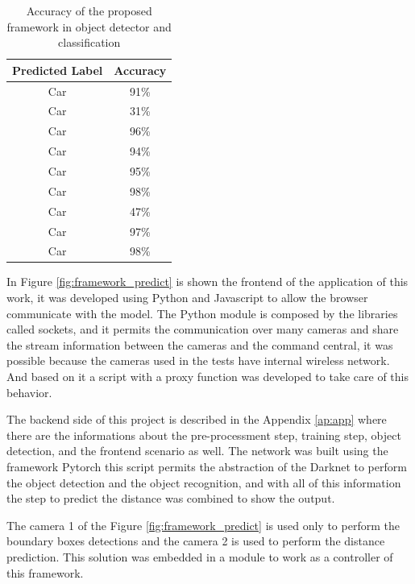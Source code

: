 \begin{table}[H]
\centering
\caption{Accuracy of the proposed framework in object detector and classification}
\begin{tabular}{c|c}
\hline
Predicted Label & Accuracy \\ \hline
Car             & 91\%     \\ \hline
Car             & 31\%     \\ \hline
Car             & 96\%     \\ \hline
Car             & 94\%     \\ \hline
Car             & 95\%     \\ \hline
Car             & 98\%     \\ \hline
Car             & 47\%     \\ \hline
Car             & 97\%     \\ \hline
Car             & 98\%     \\ \hline
\end{tabular}
\label{tab:accuracy}
\end{table}



In Figure \ref{fig:framework_predict} is shown the frontend of the application of this work, it was developed using Python and Javascript to allow the browser communicate with the model. The Python module is composed by the libraries called sockets, and it permits the communication over many cameras and share the stream information between the cameras and the command central, it was possible because the cameras used in the tests have internal wireless network. And based on it a script with a proxy function was developed to take care of this behavior. 

The backend side of this project is described in the Appendix \ref{ap:app} where there are the informations about the pre-processment step, training step, object detection, and the frontend scenario as well. The network was built using the framework Pytorch \cite{paszke2019pytorch} this script permits the abstraction of the Darknet to perform the object detection and the object recognition, and with all of this information the step to predict the distance was combined to show the output. 

The camera 1 of the Figure \ref{fig:framework_predict} is used only to perform the boundary boxes detections and the camera 2 is used to perform the distance prediction. This solution was embedded in a module to work as a controller of this framework.

